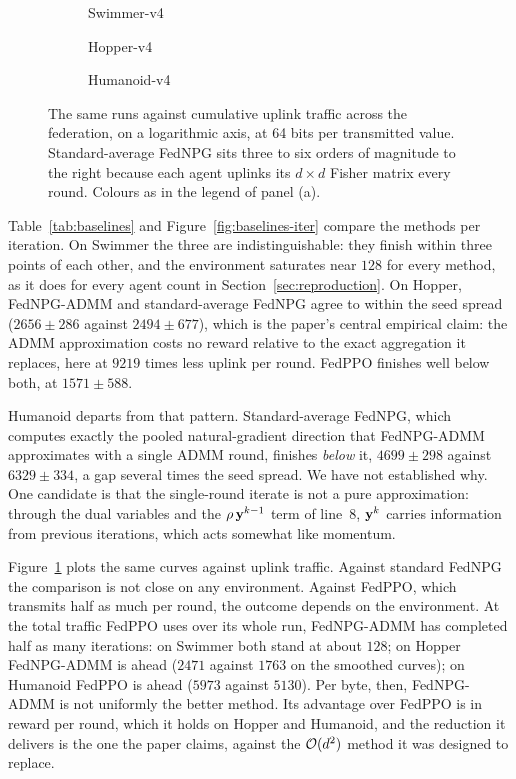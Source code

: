 \begin{figure}[t]
  \centering
  \begin{subfigure}[b]{0.49\textwidth}
    
    \caption{Swimmer-v4}
  \end{subfigure}
  \hfill
  \begin{subfigure}[b]{0.49\textwidth}
    
    \caption{Hopper-v4}
  \end{subfigure}

  \vspace{0.6em}
  \begin{subfigure}[b]{0.49\textwidth}
    
    \caption{Humanoid-v4}
  \end{subfigure}
  \caption{The same runs against cumulative uplink traffic across the
  federation, on a logarithmic axis, at 64 bits per transmitted value.
  Standard-average FedNPG sits three to six orders of magnitude to the right
  because each agent uplinks its $d \times d$ Fisher matrix every round.
  Colours as in the legend of panel (a).}
  \label{fig:baselines-bytes}
\end{figure}

Table~\ref{tab:baselines} and Figure~\ref{fig:baselines-iter} compare the
methods per iteration. On Swimmer the three are indistinguishable: they finish
within three points of each other, and the environment saturates near $128$
for every method, as it does for every agent count in
Section~\ref{sec:reproduction}. On Hopper, FedNPG-ADMM and standard-average
FedNPG agree to within the seed spread ($2656 \pm 286$ against
$2494 \pm 677$), which is the paper's central empirical claim: the ADMM
approximation costs no reward relative to the exact aggregation it replaces,
here at $\num{9219}$ times less uplink per round. FedPPO finishes well below
both, at $1571 \pm 588$.

Humanoid departs from that pattern. Standard-average FedNPG, which computes
exactly the pooled natural-gradient direction that FedNPG-ADMM approximates
with a single ADMM round, finishes \emph{below} it, $4699 \pm 298$ against
$6329 \pm 334$, a gap several times the seed spread. We have not established
why. One candidate is that the single-round iterate is not a pure
approximation: through the dual variables and the $\rho\, \mathbf{y}^{k-1}$ term of
line~8, $\mathbf{y}^k$ carries information from previous iterations, which acts
somewhat like momentum.

Figure~\ref{fig:baselines-bytes} plots the same curves against uplink traffic. Against standard
FedNPG the comparison is not close on any environment. Against FedPPO, which
transmits half as much per round, the outcome depends on the environment. At
the total traffic FedPPO uses over its whole run, FedNPG-ADMM has completed
half as many iterations: on Swimmer both stand at about $128$; on Hopper
FedNPG-ADMM is ahead ($2471$ against $1763$ on the smoothed curves); on
Humanoid FedPPO is ahead ($5973$ against $5130$). Per byte, then, FedNPG-ADMM
is not uniformly the better method. Its advantage over FedPPO is in reward per
round, which it holds on Hopper and Humanoid, and the reduction it delivers is
the one the paper claims, against the $\mathcal{O}(d^2)$ method it was designed to
replace.

